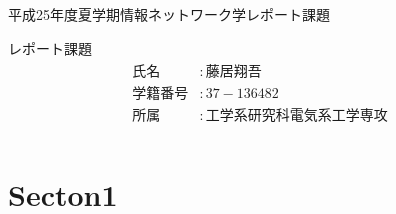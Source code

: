 \documentclass[11pt,a4paper]{jsarticle}
\begin{document}
\begin{center}
{\scriptsize{平成25年度夏学期情報ネットワーク学レポート課題}}
\begin{screen}
\begin{center}
{\Large  レポート課題}
\begin{eqnarray}
\nonumber \begin{array}{llll}
氏名 &:藤居翔吾 \\
学籍番号 &: 37-136482  \\
所属 &: 工学系研究科電気系工学専攻  \\
\end{array}
\end{eqnarray}
\end{center}
\end{screen}
\end{center}

\section{\large{Secton1}}
\end{document}
